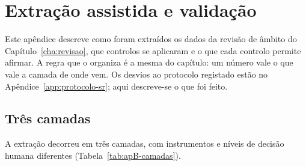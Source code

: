 
\chapter{Extração assistida e validação}
\label{app:validacao}

Este apêndice descreve como foram extraídos os dados da revisão de âmbito do
Capítulo~\ref{cha:revisao}, que controlos se aplicaram e o que cada controlo
permite afirmar. A regra que o organiza é a mesma do capítulo: um número vale
o que vale a camada de onde vem. Os desvios ao protocolo registado estão no
Apêndice~\ref{app:protocolo-sr}; aqui descreve-se o que foi feito.

\section{Três camadas}
\label{sec:apB-camadas}

A extração decorreu em três camadas, com instrumentos e níveis de decisão
humana diferentes (Tabela~\ref{tab:apB-camadas}).

